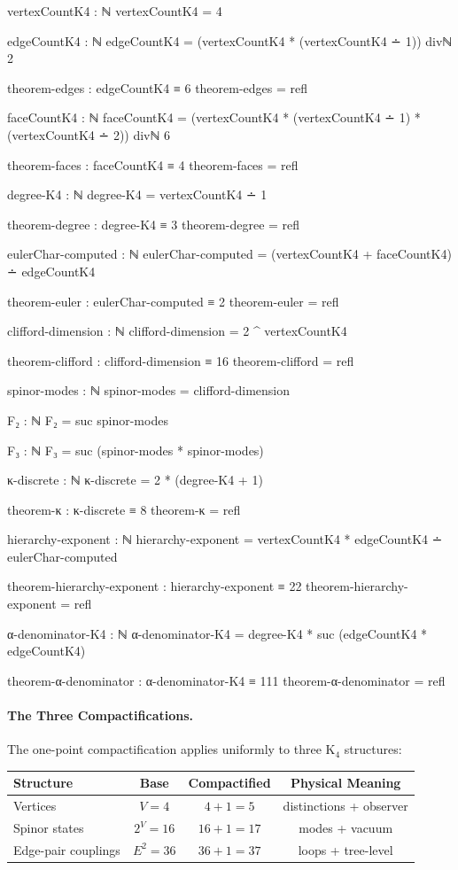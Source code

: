 \documentclass[11pt,a4paper]{book}
\begin{document}
\begin{code}
vertexCountK4 : ℕ
vertexCountK4 = 4

edgeCountK4 : ℕ
edgeCountK4 = (vertexCountK4 * (vertexCountK4 ∸ 1)) divℕ 2

theorem-edges : edgeCountK4 ≡ 6
theorem-edges = refl

faceCountK4 : ℕ
faceCountK4 = (vertexCountK4 * (vertexCountK4 ∸ 1) * (vertexCountK4 ∸ 2)) divℕ 6

theorem-faces : faceCountK4 ≡ 4
theorem-faces = refl

degree-K4 : ℕ
degree-K4 = vertexCountK4 ∸ 1

theorem-degree : degree-K4 ≡ 3
theorem-degree = refl

eulerChar-computed : ℕ
eulerChar-computed = (vertexCountK4 + faceCountK4) ∸ edgeCountK4

theorem-euler : eulerChar-computed ≡ 2
theorem-euler = refl

clifford-dimension : ℕ
clifford-dimension = 2 ^ vertexCountK4

theorem-clifford : clifford-dimension ≡ 16
theorem-clifford = refl

spinor-modes : ℕ
spinor-modes = clifford-dimension

F₂ : ℕ
F₂ = suc spinor-modes

F₃ : ℕ
F₃ = suc (spinor-modes * spinor-modes)

κ-discrete : ℕ
κ-discrete = 2 * (degree-K4 + 1)

theorem-κ : κ-discrete ≡ 8
theorem-κ = refl

hierarchy-exponent : ℕ
hierarchy-exponent = vertexCountK4 * edgeCountK4 ∸ eulerChar-computed

theorem-hierarchy-exponent : hierarchy-exponent ≡ 22
theorem-hierarchy-exponent = refl

α-denominator-K4 : ℕ
α-denominator-K4 = degree-K4 * suc (edgeCountK4 * edgeCountK4)

theorem-α-denominator : α-denominator-K4 ≡ 111
theorem-α-denominator = refl
\end{code}

\paragraph{The Three Compactifications.}
The one-point compactification applies uniformly to three K$_4$ structures:

\begin{center}
\begin{tabular}{lccc}
\hline
\textbf{Structure} & \textbf{Base} & \textbf{Compactified} & \textbf{Physical Meaning} \\
\hline
Vertices           & $V = 4$       & $4 + 1 = 5$           & distinctions + observer \\
Spinor states      & $2^V = 16$    & $16 + 1 = 17$         & modes + vacuum \\
Edge-pair couplings& $E^2 = 36$    & $36 + 1 = 37$         & loops + tree-level \\
\hline
\end{tabular}
\end{center}
\end{document}
